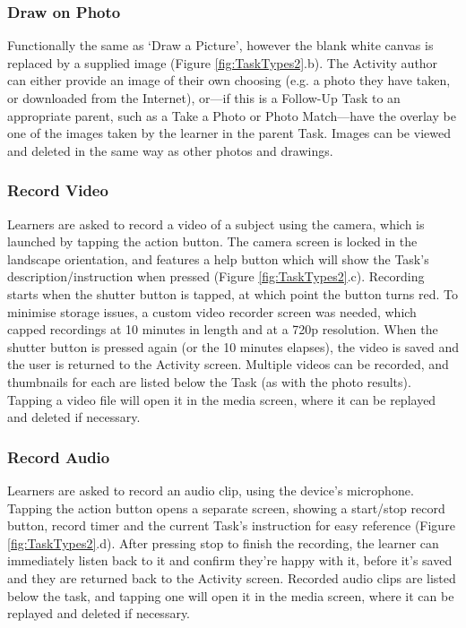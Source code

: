 \subsubsection*{Draw on Photo}
Functionally the same as `Draw a Picture', however the blank white canvas is replaced by a supplied image (Figure \ref{fig:TaskTypes2}.b). The Activity author can either provide an image of their own choosing (e.g. a photo they have taken, or downloaded from the Internet), or---if this is a Follow-Up Task to an appropriate parent, such as a Take a Photo or Photo Match---have the overlay be one of the images taken by the learner in the parent Task. Images can be viewed and deleted in the same way as other photos and drawings.

\subsubsection*{Record Video}
Learners are asked to record a video of a subject using the camera, which is launched by tapping the action button. The camera screen is locked in the landscape orientation, and features a help button which will show the Task's description/instruction when pressed (Figure \ref{fig:TaskTypes2}.c). Recording starts when the shutter button is tapped, at which point the button turns red. To minimise storage issues, a custom video recorder screen was needed, which capped recordings at 10 minutes in length and at a 720p resolution. When the shutter button is pressed again (or the 10 minutes elapses), the video is saved and the user is returned to the Activity screen. Multiple videos can be recorded, and thumbnails for each are listed below the Task (as with the photo results). Tapping a video file will open it in the media screen, where it can be replayed and deleted if necessary.

\subsubsection*{Record Audio}
Learners are asked to record an audio clip, using the device's microphone. Tapping the action button opens a separate screen, showing a start/stop record button, record timer and the current Task's instruction for easy reference (Figure \ref{fig:TaskTypes2}.d). After pressing stop to finish the recording, the learner can immediately listen back to it and confirm they're happy with it, before it's saved and they are returned back to the Activity screen. Recorded audio clips are listed below the task, and tapping one will open it in the media screen, where it can be replayed and deleted if necessary.

